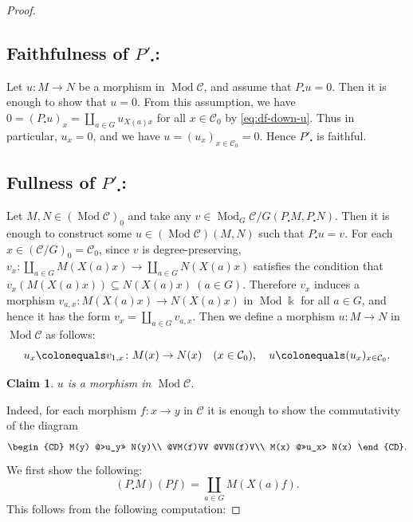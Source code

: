 \documentclass{surv-l}
\numberwithin{equation}{chapter}
\numberwithin{figure}{chapter}
\theoremstyle{plain}
\newtheorem{clm}{Claim}
\theoremstyle{definition}
\theoremstyle{remark}
\DeclareMathOperator{\Mod}{Mod}
\begin{document}
\begin{proof}
\subsection*{Faithfulness of $P'_{\centerdot}$:}
Let $u \colon M \to N$ be a morphism in $\Mod{\mathcal{C}}$, and assume that $P_{\centerdot} u = 0$.
Then it is enough to show that $u = 0$.
From this assumption, we have
$0 = (P_{\centerdot} u)_x = \coprod_{a\in G} u_{X(a)x}$ for all $x \in {\mathcal{C}}_0$ by \eqref{eq:df-down-u}.
Thus in particular, $u_x = 0$, and we have $u = (u_x)_{x \in {\mathcal{C}}_0} = 0$.
Hence $P'_{\centerdot}$ is faithful.


\subsection*{Fullness of $P'_{\centerdot}$:}
Let $M, N \!\in\! (\Mod{\mathcal{C}})_0$ and take any $v \!\in\! \Mod_{G}{\mathcal{C}}/G(P_{\centerdot} M, P_{\centerdot} N)$.
Then it is enough to construct some $u \in (\Mod{\mathcal{C}})(M, N)$ such that $P_{\centerdot} u = v$.
For each $x \in ({\mathcal{C}}/G)_0 = {\mathcal{C}}_0$,
since $v$ is degree-preserving,
$v_{x}\colon \coprod_{a\in G}M(X(a) x) \to \coprod_{a \in G}N(X(a)x)$
satisfies the condition that
$v_x(M(X(a) x)) \subseteq N(X(a) x)\ (a \in G)$.
Therefore $v_x$ induces a morphism
$v_{a,x} \colon M(X(a)x) \to N(X(a)x)$ in $\Mod \Bbbk$
for all $a \in G$, and hence it has the form
$v_{x} = \coprod_{a \in G} v_{a,x}$.
Then we define a morphism $u\colon M \to N$ in
$\Mod {\mathcal{C}}$ as follows:
\begin{equation}\label{eq:dfn-of-u}
u_x\colonequals  v_{1,x} \colon M(x) \to N(x) \quad (x\in {\mathcal{C}}_0),\quad  u\colonequals  (u_{x})_{x\in {\mathcal{C}}_0}.
\end{equation}
\begin{clm}
$u$ is a morphism in $\Mod {\mathcal{C}}$.
\end{clm}
Indeed, for each morphism $f\colon x \to y$ in ${\mathcal{C}}$
it is enough to show the commutativity of the diagram
\begin{equation}\label{eq:u-morph}
\begin{CD}
M(y) @>u_y>> N(y)\\
@VM(f)VV @VVN(f)V\\
M(x) @>>u_x> N(x)
\end{CD}.
\end{equation}
We first show the following:
\[
(P_{\centerdot} M)(P f) = \coprod_{a \in G}M(X(a)f).
\]
This follows from the following computation:

\end{proof}
\end{document}
